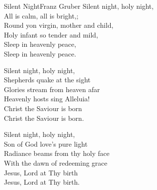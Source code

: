 \documentclass[a4paper,12pt]{article}
\begin{document}
\begin{song}{Silent Night}{Franz Gruber}
Silent night, holy night,\\
All is calm,  all is bright,;\\
Round yon virgin, mother and child,\\
Holy infant so tender and mild,\\
Sleep in heavenly peace,\\
Sleep in heavenly peace.
\bigskip

Silent night, holy night,\\
Shepherds quake at the sight\\
Glories stream from heaven afar\\
Heavenly hosts sing Alleluia!\\
Christ the Saviour is born\\
Christ the Saviour is born.

\bigskip 

Silent night, holy night,\\
Son of God love's pure light\\
Radiance beams from thy holy face\\
With the dawn of redeeming grace\\
Jesus, Lord at Thy birth\\
Jesus, Lord at Thy birth.
\end{song}
\end{document}
